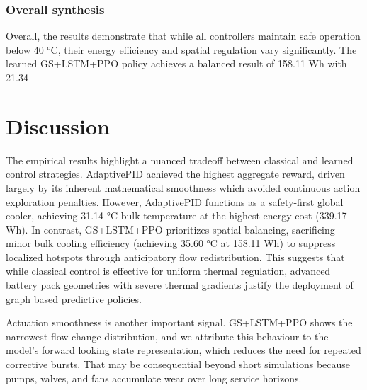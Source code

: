 \documentclass[twocolumn]{article}
\begin{document}
\subsubsection*{Overall synthesis}

Overall, the results demonstrate that while all controllers maintain safe operation below 40 °C, their energy efficiency and spatial regulation vary significantly. The learned GS+LSTM+PPO policy achieves a balanced result of 158.11 Wh with 21.34%

\section*{Discussion}

The empirical results highlight a nuanced tradeoff between classical and learned control strategies. AdaptivePID achieved the highest aggregate reward, driven largely by its inherent mathematical smoothness which avoided continuous action exploration penalties. However, AdaptivePID functions as a safety-first global cooler, achieving 31.14 °C bulk temperature at the highest energy cost (339.17 Wh). In contrast, GS+LSTM+PPO prioritizes spatial balancing, sacrificing minor bulk cooling efficiency (achieving 35.60 °C at 158.11 Wh) to suppress localized hotspots through anticipatory flow redistribution. This suggests that while classical control is effective for uniform thermal regulation, advanced battery pack geometries with severe thermal gradients justify the deployment of graph based predictive policies.

Actuation smoothness is another important signal. GS+LSTM+PPO shows the narrowest flow change distribution, and we attribute this behaviour to the model's forward looking state representation, which reduces the need for repeated corrective bursts. That may be consequential beyond short simulations because pumps, valves, and fans accumulate wear over long service horizons.
\end{document}
